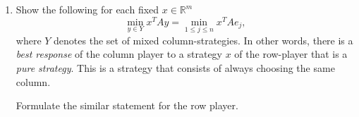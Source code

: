 \begin{enumerate}
\begin{enumerate}
Show that for any $j\in \{1, \ldots, n\}$ we have $\bar c_j < 0$ if and
only if  $A_j^T y > c_j$.
\end{enumerate}


\item
Show the  following for each  fixed $x ∈ ℝ^m$ 
\begin{displaymath}  
\min_{y\in Y} x^TA y = \min_{1≤j≤n } 
x^TAe_j,
\end{displaymath}
where   $Y$ denotes the set of mixed  column-strategies.
   In other words, there is a  \emph{best response} of the column player to a strategy $x$ of the row-player that is a \emph{pure strategy}. This is a strategy that consists of always choosing the same column.

 Formulate the similar statement for the row player.  \label{ex:br} 
\end{enumerate}








